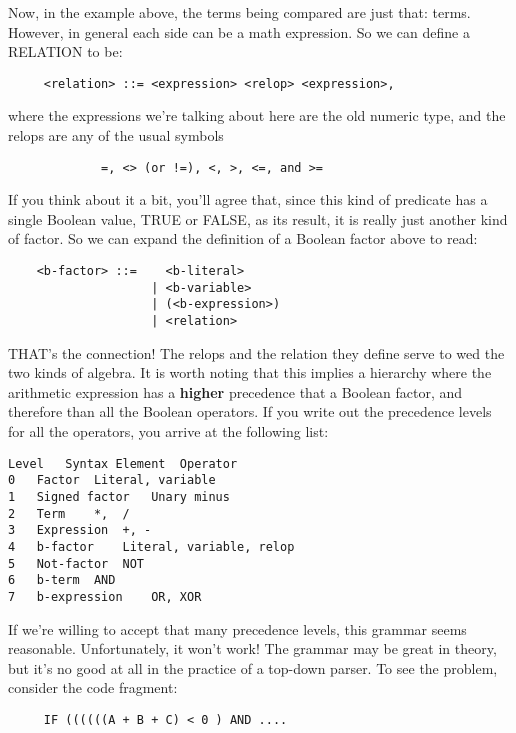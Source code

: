 Now, in the example above, the terms  being  compared  are  just that:  terms. However, in  general  each  side  can be a math expression. So we can define a RELATION to be:

\begin{verbatim}
     <relation> ::= <expression> <relop> <expression>,
\end{verbatim}

where  the  expressions  we're  talking  about here are  the  old numeric type, and the relops are any of the usual symbols

\begin{verbatim}
             =, <> (or !=), <, >, <=, and >=
\end{verbatim}

If you think about it a  bit, you'll agree that, since this kind of predicate has a single Boolean value, TRUE or  FALSE, as  its result, it is  really  just  another  kind  of factor. So we can expand the definition of a Boolean factor above to read:

\begin{verbatim}
    <b-factor> ::=    <b-literal>
                    | <b-variable>
                    | (<b-expression>)
                    | <relation>
\end{verbatim}

THAT's the connection!  The relops and the  relation  they define serve to wed the two kinds of algebra. It  is  worth noting that this implies a hierarchy  where  the  arithmetic expression has a {\bfseries higher} precedence that  a  Boolean factor, and therefore than all the  Boolean operators. If you write out the precedence levels for all the operators, you arrive at the following list:

\begin{verbatim}
Level	Syntax Element	Operator
0	Factor	Literal, variable
1	Signed factor	Unary minus
2	Term	*,  /
3	Expression	+, -
4	b-factor	Literal, variable, relop
5	Not-factor	NOT
6	b-term	AND
7	b-expression	OR, XOR
\end{verbatim}

If  we're willing to accept that  many  precedence  levels, this grammar seems reasonable. Unfortunately, it  won't  work!   The grammar may be great in theory, but  it's  no good at all in the practice of a top-down parser. To see the problem, consider the code fragment:

\begin{verbatim}
     IF ((((((A + B + C) < 0 ) AND ....
\end{verbatim}

